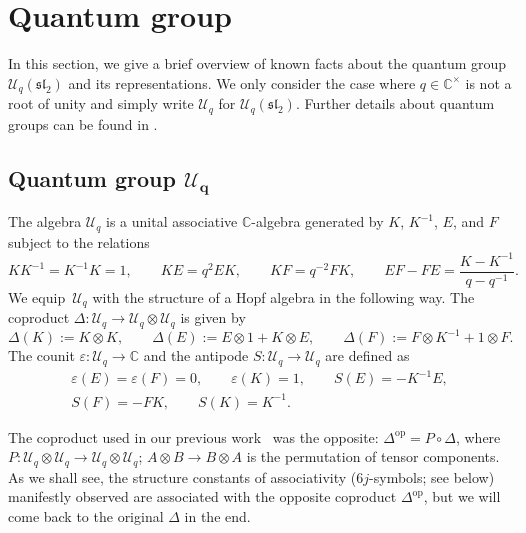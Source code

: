 \documentclass[pdftex]{sigma}
\numberwithin{equation}{section}
\newcommand{\op}{\mathrm{op}}
\newcommand{\bC}{\mathbb{C}}
\newcommand{\cU}{\mathcal{U}}
\newcommand{\fsl}{\mathfrak{sl}}
\newcommand{\UEA}{\cU}
\newcommand{\Uq}{\UEA_{q}}
\newcommand{\QGcoprod}{\Delta}
\newcommand{\QGcounit}{\varepsilon}
\newcommand{\QGantipode}{S}
\begin{document}
\section{Quantum group}
\label{sect:quantum_group}
In this section, we give a brief overview of known facts about the quantum group $\Uq (\fsl_{2})$ and its representations.
We only consider the case where $q\in\bC^{\times}$ is not a root of unity and simply write $\Uq$ for $\Uq (\fsl_{2})$.
Further details about quantum groups can be found in \cite{chari1995guide, Kassel-quantum_groups,Lusztig1993}.

\subsection[Quantum group U\_q]{Quantum group $\boldsymbol{\Uq}$}
The algebra $\Uq$ is a unital associative $\bC$-algebra generated by
$K$, $K^{-1}$, $E$, and $F$ subject to the relations
\[
 KK^{-1}=K^{-1}K=1, \qquad
 KE=q^{2}EK, \qquad KF=q^{-2}FK, \qquad
 EF-FE=\frac{K-K^{-1}}{q-q^{-1}}.
 \]
We equip~$\Uq$ with the structure of a Hopf algebra in the following way.
The coproduct $\QGcoprod\colon \Uq\to \Uq\otimes\Uq$ is given by
\[
 \QGcoprod (K) :=K\otimes K, \qquad
 \QGcoprod (E) :=E\otimes 1+K\otimes E, \qquad
 \QGcoprod (F) :=F\otimes K^{-1} +1\otimes F.
 \]
The counit $\QGcounit \colon \Uq\to\bC$ and the antipode $\QGantipode\colon \Uq\to\Uq$ are defined as
\begin{gather*}
 \QGcounit (E)=\QGcounit (F)=0, \qquad \QGcounit (K)=1, \qquad
 \QGantipode (E)=-K^{-1}E, \\ \QGantipode (F)=-FK, \qquad \QGantipode (K)=K^{-1}.
\end{gather*}

\begin{rem}
The coproduct used in our previous work~\cite{KoshidaKytola2022} was the opposite: $\QGcoprod^{\op}=P\circ \QGcoprod$, where
$
 P\colon \Uq\otimes\Uq \to \Uq\otimes \Uq$; $ A\otimes B\to B\otimes A$
is the permutation of tensor components.
As we shall see, the structure constants of associativity ($6j$-symbols; see below) manifestly observed are associated with the opposite coproduct $\QGcoprod^{\op}$, but we will come back to the original $\QGcoprod$ in the end.
\end{rem}
\end{document}
